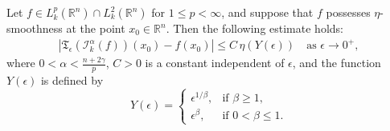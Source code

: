 \documentclass[10pt,a4paper]{amsart}
\begin{document}
\begin{theorem}\label{Riez-R-of-C}
Let \( f \in L_k^p(\mathbb{R}^n) \cap L_k^2(\mathbb{R}^n) \) for \( 1 \leq p < \infty \), and suppose that \( f \) possesses \(\eta\)-smoothness at the point \( x_0 \in \mathbb{R}^n \). Then the following estimate holds:
\begin{align*}
    \left| \mathfrak{T}_\epsilon(\mathcal{I}_k^{\alpha}(f))(x_0)- f(x_0) \right| \leq C\,\eta(Y(\epsilon)) \quad \text{as } \epsilon \to 0^+,
\end{align*}
where \( 0 < \alpha < \frac{n+2\gamma}{p} \), \( C>0\) is a constant independent of \( \epsilon\), and the function \( Y(\epsilon) \) is defined by
\begin{equation*}
     Y(\epsilon) =   
\begin{cases} 
  \epsilon^{1/\beta}, & \text{if } \beta \geq 1, \\ 
  \epsilon^{\beta},   & \text{if } 0 < \beta \leq 1.
\end{cases}
\end{equation*}
\end{theorem}
\end{document}
